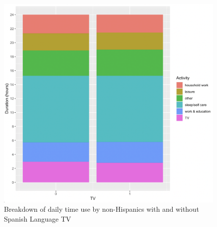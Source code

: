 \documentclass[11pt]{article}
\begin{document}
\begin{figure}[!hbtp]
\centering
\caption{Breakdown of daily time use by non-Hispanics with and without Spanish Language TV}\label{f:atus_breakdown_nonhispanic}
\includegraphics[width=14.4cm]{../../analysis/Output/graphs/time_breakdown_nonhispanic.png}
\end{figure} 


\end{document}

